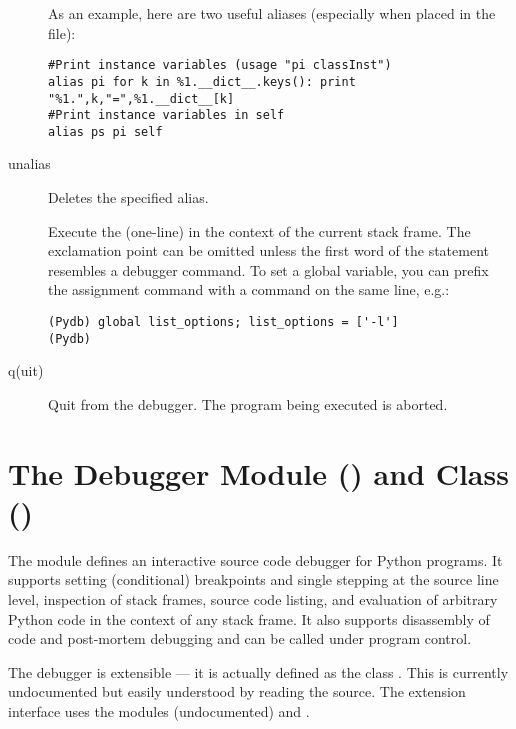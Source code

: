 \begin{description}
As an example, here are two useful aliases (especially when placed
in the  file):

\begin{verbatim}
#Print instance variables (usage "pi classInst")
alias pi for k in %1.__dict__.keys(): print "%1.",k,"=",%1.__dict__[k]
#Print instance variables in self
alias ps pi self
\end{verbatim}
                
\item[unalias \var{name}]

Deletes the specified alias.

\item[\optional{!}\var{statement}]

Execute the (one-line)  in the context of
the current stack frame.
The exclamation point can be omitted unless the first word
of the statement resembles a debugger command.
To set a global variable, you can prefix the assignment
command with a  command on the same line, e.g.:

\begin{verbatim}
(Pydb) global list_options; list_options = ['-l']
(Pydb)
\end{verbatim}

\item[q(uit)]

Quit from the debugger.
The program being executed is aborted.

\end{description}

\section{The Debugger Module () and Class () \label{debugger-module}}

The module  defines an interactive source code
debugger for Python programs.  It supports setting
(conditional) breakpoints and single stepping at the source line
level, inspection of stack frames, source code listing, and evaluation
of arbitrary Python code in the context of any stack frame.  It also
supports disassembly of code and post-mortem debugging and can be
called under program control.

The debugger is extensible --- it is actually defined as the class
.
This is currently undocumented but easily understood by reading the
source.  The extension interface uses the modules
 (undocumented) and
.

